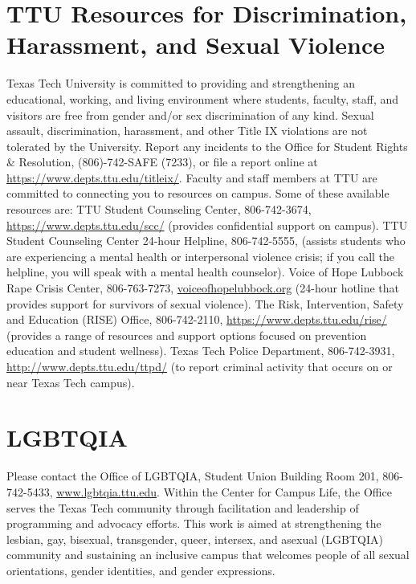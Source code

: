 \documentclass[12pt, notitlepage]{article}   	%
\begin{document}
{\section{TTU Resources for Discrimination, Harassment, and Sexual Violence}
Texas Tech University is committed to providing and strengthening an educational, 
working, and living environment where students, faculty, staff, and visitors are 
free from gender and/or sex discrimination of any kind. 
Sexual assault, discrimination, harassment, and other Title IX violations are 
not tolerated by the University. 
Report any incidents to the Office for Student Rights & Resolution, 
(806)-742-SAFE (7233), or file a report online at \url{https://www.depts.ttu.edu/titleix/}. 
Faculty and staff members at TTU are committed to connecting you to resources on campus. 
Some of these available resources are: TTU Student Counseling Center, 806-742-3674, 
\url{https://www.depts.ttu.edu/scc/} (provides confidential support on campus). 
TTU Student Counseling Center 24-hour Helpline, 806-742-5555, 
(assists students who are experiencing a mental health or interpersonal violence crisis; 
if you call the helpline, you will speak with a mental health counselor). 
Voice of Hope Lubbock Rape Crisis Center, 806-763-7273, \url{voiceofhopelubbock.org} 
(24-hour hotline that provides support for survivors of sexual violence). 
The Risk, Intervention, Safety and Education (RISE) Office, 806-742-2110, 
\url{https://www.depts.ttu.edu/rise/} (provides a range of resources and 
support options focused on prevention education and student wellness). 
Texas Tech Police Department, 806-742-3931, \url{http://www.depts.ttu.edu/ttpd/} 
(to report criminal activity that occurs on or near Texas Tech campus). 

\section{LGBTQIA}
Please contact the Office of LGBTQIA, Student Union Building Room 201, 806-742-5433, 
\url{www.lgbtqia.ttu.edu}. 
Within the Center for Campus Life, the Office serves the Texas Tech community 
through facilitation and leadership of programming and advocacy efforts. 
This work is aimed at strengthening the lesbian, gay, bisexual, transgender, queer, 
intersex, and asexual (LGBTQIA) community and sustaining an inclusive campus that 
welcomes people of all sexual orientations, gender identities, and gender expressions. 

}
\end{document}
